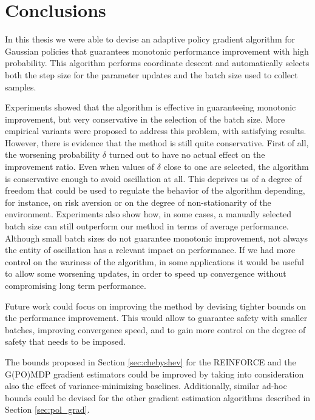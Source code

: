 \chapter{Conclusions}\label{chap:conclusion}
In this thesis we were able to devise an adaptive policy gradient algorithm for Gaussian policies that guarantees monotonic performance improvement with high probability. This algorithm performs coordinate descent and automatically selects both the step size for the parameter updates and the batch size used to collect samples. 

Experiments showed that the algorithm is effective in guaranteeing monotonic improvement, but very conservative in the selection of the batch size. More empirical variants were proposed to address this problem, with satisfying results. However, there is evidence that the method is still quite conservative.
First of all, the worsening probability $\delta$ turned out to have no actual effect on the improvement ratio. Even when values of $\delta$ close to one are selected, the algorithm is conservative enough to avoid oscillation at all. This deprives us of a degree of freedom that could be used to regulate the behavior of the algorithm depending, for instance, on risk aversion or on the degree of non-stationarity of the environment.
Experiments also show how, in some cases, a manually selected batch size can still outperform our method in terms of average performance. Although small batch sizes do not guarantee monotonic improvement, not always the entity of oscillation has a relevant impact on performance. If we had more control on the wariness of the algorithm, in some applications it would be useful to allow some worsening updates, in order to speed up convergence without compromising long term performance.

Future work could focus on improving the method by devising tighter bounds on the performance improvement.
This would allow to guarantee safety with smaller batches, improving convergence speed, and to gain more control on the degree of safety that needs to be imposed.

The bounds proposed in Section \ref{sec:chebyshev} for the REINFORCE and the G(PO)MDP gradient estimators could be improved by taking into consideration also the effect of variance-minimizing baselines. Additionally, similar ad-hoc bounds could be devised for the other gradient estimation algorithms described in Section \ref{sec:pol_grad}.

